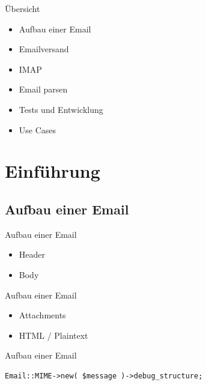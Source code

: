 \usepackage{minted}

\date{GPW 2018, Gummersbach, 5. April}


\maketitle

\begin{frame}
  \titlepage
\end{frame}

\cleardoublepage

\tableofcontents

\cleardoublepage

\begin{frame}{Übersicht}
  \begin{itemize}
  \item Aufbau einer Email
  \item Emailversand
  \item IMAP
  \item Email parsen
  \item Tests und Entwicklung
  \item Use Cases  
  \end{itemize}
\end{frame}

\section{Einführung}

\subsection{Aufbau einer Email}

\begin{frame}{Aufbau einer Email}
  \begin{itemize}
  \item Header
  \item Body
  \end{itemize}
\end{frame}

\begin{frame}{Aufbau einer Email}
  \begin{itemize}
  \item Attachments
  \item HTML / Plaintext
  \end{itemize}
\end{frame}

\begin{frame}[fragile]{Aufbau einer Email}
\begin{verbatim}
Email::MIME->new( $message )->debug_structure;
\end{verbatim}
\end{frame}

